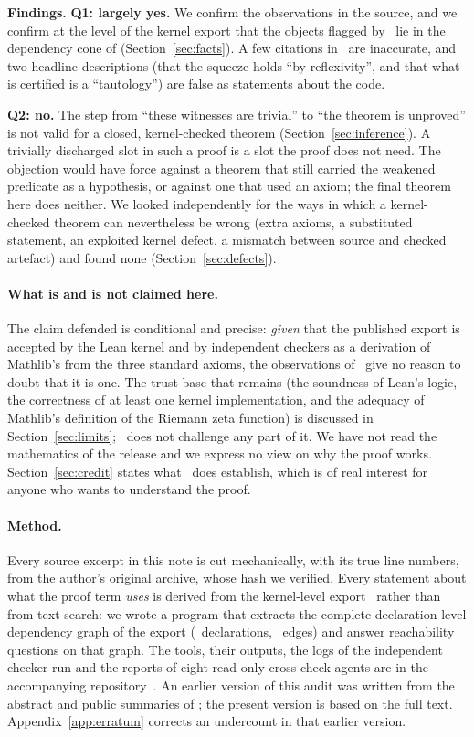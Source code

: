\begin{verdictbox}
\textbf{Findings.}
\textbf{Q1: largely yes.} We confirm the observations in the source, and we confirm at the level of the kernel export that the objects flagged by \N\ lie in the dependency cone of 
(Section~\ref{sec:facts}). A few citations in \N\ are inaccurate, and two headline descriptions (that the squeeze holds ``by reflexivity'', and that what is certified is a ``tautology'') are false as statements about the code.

\textbf{Q2: no.} The step from ``these witnesses are trivial'' to ``the theorem is unproved'' is not valid for a closed, kernel-checked theorem (Section~\ref{sec:inference}).
A trivially discharged slot in such a proof is a slot the proof does not need. The objection would have force against a theorem that still carried the weakened predicate as a hypothesis, or against one that used an axiom; the final theorem here does neither.
We looked independently for the ways in which a kernel-checked theorem can nevertheless be wrong (extra axioms, a substituted statement, an exploited kernel defect, a mismatch between source and checked artefact) and found none (Section~\ref{sec:defects}).
\end{verdictbox}

\paragraph{What is and is not claimed here.}
The claim defended is conditional and precise: \emph{given} that the published export is accepted by the Lean kernel and by independent checkers as a derivation of Mathlib's  from the three standard axioms,
the observations of \N\ give no reason to doubt that it is one. The trust base that remains (the soundness of Lean's logic, the correctness of at least one kernel implementation, and the adequacy of Mathlib's definition of the Riemann zeta function)
is discussed in Section~\ref{sec:limits}; \N\ does not challenge any part of it.
We have not read the mathematics of the release and we express no view on why the proof works.
Section~\ref{sec:credit} states what \N\ does establish, which is of real interest for anyone who wants to understand the proof.

\paragraph{Method.}
Every source excerpt in this note is cut mechanically, with its true line numbers, from the author's original archive, whose hash we verified.
Every statement about what the proof term \emph{uses} is derived from the kernel-level export~\cite{mit} rather than from text search:
we wrote a program that extracts the complete declaration-level dependency graph of the export (\Ndecl\ declarations, \Nedges\ edges) and answer reachability questions on that graph.
The tools, their outputs, the logs of the independent checker run and the reports of eight read-only cross-check agents are in the accompanying repository~\cite{repo}.
An earlier version of this audit was written from the abstract and public summaries of \N; the present version is based on the full text.
Appendix~\ref{app:erratum} corrects an undercount in that earlier version.
